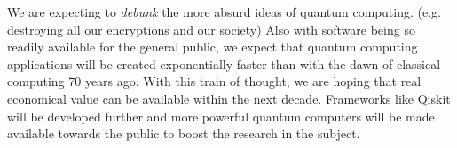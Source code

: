 We are expecting to \emph{debunk} the more absurd ideas of quantum computing. (e.g. destroying all our encryptions and our society) Also with software being so readily available for the general public, we expect that quantum computing applications will be created exponentially faster than with the dawn of classical computing 70 years ago. With this train of thought, we are hoping that real economical value can be available within the next decade. Frameworks like Qiskit will be developed further and more powerful quantum computers will be made available towards the public to boost the research in the subject.


